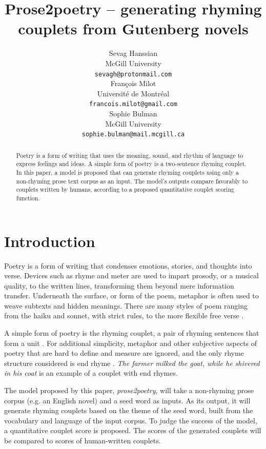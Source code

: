 \documentclass[11pt,a4paper]{article}
\title{Prose2poetry -- generating rhyming couplets from Gutenberg novels}
\author{Sevag Hanssian \\
  McGill University \\
  \texttt{sevagh@protonmail.com} \\\And
  François Milot \\
  Université de Montréal \\
  \texttt{francois.milot@gmail.com} \\\AND Sophie Bulman \\
  McGill University \\
  \texttt{sophie.bulman@mail.mcgill.ca}}
\date{}
\begin{document}
\maketitle
\begin{abstract}
	Poetry is a form of writing that uses the meaning, sound, and rhythm of language to express feelings and ideas. A simple form of poetry is a two-sentence rhyming couplet. In this paper, a model is proposed that can generate rhyming couplets using only a non-rhyming prose text corpus as an input. The model's outputs compare favorably to couplets written by humans, according to a proposed quantitative couplet scoring function.
\end{abstract}

\section{Introduction}
\label{sec:intro}

Poetry is a form of writing that condenses emotions, stories, and thoughts into verse. Devices such as rhyme and meter are used to impart prosody, or a musical quality, to the written lines, transforming them beyond mere information transfer. Underneath the surface, or form of the poem, metaphor is often used to weave subtexts and hidden meanings. There are many styles of poem ranging from the haiku and sonnet, with strict rules, to the more flexible free verse \citep{poem_type}.

A simple form of poetry is the rhyming couplet, a pair of rhyming sentences that form a unit \cite{couplet_def}. For additional simplicity, metaphor and other subjective aspects of poetry that are hard to define and measure are ignored, and the only rhyme structure considered is end rhyme \cite{end_rhyme_def}. \textit{The farmer milked the goat, while he shivered in his coat} is an example of a couplet with end rhymes.

The model proposed by this paper, \textit{prose2poetry}, will take a non-rhyming prose corpus (e.g. an English novel) and a seed word as inputs. As its output, it will generate rhyming couplets based on the theme of the seed word, built from the vocabulary and language of the input corpus. To judge the success of the model, a quantitative couplet score is proposed. The scores of the generated couplets will be compared to scores of human-written couplets.

\end{document}
